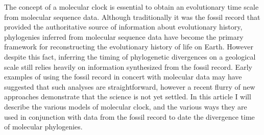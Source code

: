 The concept of a molecular clock is essential to obtain an evolutionary time scale from molecular sequence data.
Although traditionally it was the fossil record that provided the authoritative source of information about evolutionary history, phylogenies inferred from molecular sequence data have become the primary framework for reconstructing the evolutionary history of life on Earth. However despite this fact, inferring the timing of phylogenetic divergences on a geological scale still relies heavily on information synthesized from the fossil record. Early examples of using the fossil record in concert with molecular data may have suggested that such analyses are straightforward, however a recent flurry of new approaches demonstrate that the science is not yet settled. In this article I will describe the various models of molecular clock, and the various ways they are used in conjunction with data from the fossil record to date the divergence time of molecular phylogenies.
  